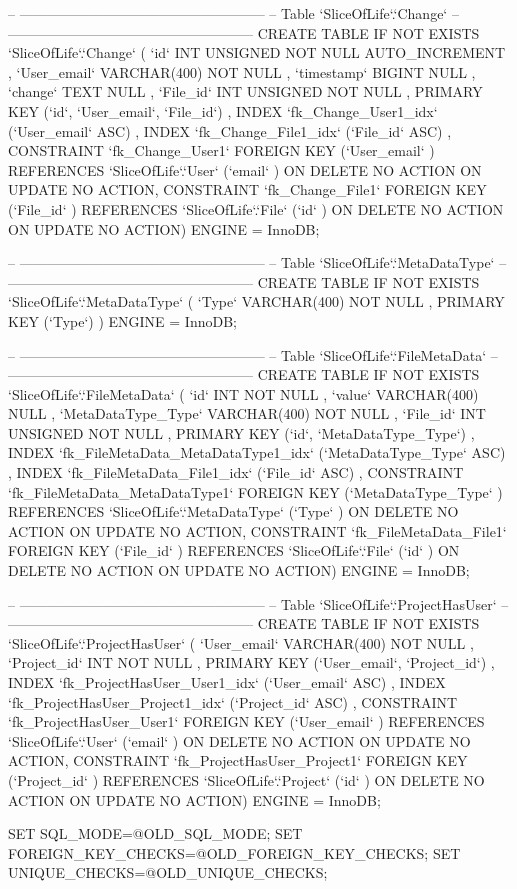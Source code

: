 \begin{spverbatim}
-- -----------------------------------------------------
-- Table `SliceOfLife`.`Change`
-- -----------------------------------------------------
CREATE  TABLE IF NOT EXISTS `SliceOfLife`.`Change` (
  `id` INT UNSIGNED NOT NULL AUTO_INCREMENT ,
  `User_email` VARCHAR(400) NOT NULL ,
  `timestamp` BIGINT NULL ,
  `change` TEXT NULL ,
  `File_id` INT UNSIGNED NOT NULL ,
  PRIMARY KEY (`id`, `User_email`, `File_id`) ,
  INDEX `fk_Change_User1_idx` (`User_email` ASC) ,
  INDEX `fk_Change_File1_idx` (`File_id` ASC) ,
  CONSTRAINT `fk_Change_User1`
    FOREIGN KEY (`User_email` )
    REFERENCES `SliceOfLife`.`User` (`email` )
    ON DELETE NO ACTION
    ON UPDATE NO ACTION,
  CONSTRAINT `fk_Change_File1`
    FOREIGN KEY (`File_id` )
    REFERENCES `SliceOfLife`.`File` (`id` )
    ON DELETE NO ACTION
    ON UPDATE NO ACTION)
ENGINE = InnoDB;


-- -----------------------------------------------------
-- Table `SliceOfLife`.`MetaDataType`
-- -----------------------------------------------------
CREATE  TABLE IF NOT EXISTS `SliceOfLife`.`MetaDataType` (
  `Type` VARCHAR(400) NOT NULL ,
  PRIMARY KEY (`Type`) )
ENGINE = InnoDB;


-- -----------------------------------------------------
-- Table `SliceOfLife`.`FileMetaData`
-- -----------------------------------------------------
CREATE  TABLE IF NOT EXISTS `SliceOfLife`.`FileMetaData` (
  `id` INT NOT NULL ,
  `value` VARCHAR(400) NULL ,
  `MetaDataType_Type` VARCHAR(400) NOT NULL ,
  `File_id` INT UNSIGNED NOT NULL ,
  PRIMARY KEY (`id`, `MetaDataType_Type`) ,
  INDEX `fk_FileMetaData_MetaDataType1_idx` (`MetaDataType_Type` ASC) ,
  INDEX `fk_FileMetaData_File1_idx` (`File_id` ASC) ,
  CONSTRAINT `fk_FileMetaData_MetaDataType1`
    FOREIGN KEY (`MetaDataType_Type` )
    REFERENCES `SliceOfLife`.`MetaDataType` (`Type` )
    ON DELETE NO ACTION
    ON UPDATE NO ACTION,
  CONSTRAINT `fk_FileMetaData_File1`
    FOREIGN KEY (`File_id` )
    REFERENCES `SliceOfLife`.`File` (`id` )
    ON DELETE NO ACTION
    ON UPDATE NO ACTION)
ENGINE = InnoDB;


-- -----------------------------------------------------
-- Table `SliceOfLife`.`ProjectHasUser`
-- -----------------------------------------------------
CREATE  TABLE IF NOT EXISTS `SliceOfLife`.`ProjectHasUser` (
  `User_email` VARCHAR(400) NOT NULL ,
  `Project_id` INT NOT NULL ,
  PRIMARY KEY (`User_email`, `Project_id`) ,
  INDEX `fk_ProjectHasUser_User1_idx` (`User_email` ASC) ,
  INDEX `fk_ProjectHasUser_Project1_idx` (`Project_id` ASC) ,
  CONSTRAINT `fk_ProjectHasUser_User1`
    FOREIGN KEY (`User_email` )
    REFERENCES `SliceOfLife`.`User` (`email` )
    ON DELETE NO ACTION
    ON UPDATE NO ACTION,
  CONSTRAINT `fk_ProjectHasUser_Project1`
    FOREIGN KEY (`Project_id` )
    REFERENCES `SliceOfLife`.`Project` (`id` )
    ON DELETE NO ACTION
    ON UPDATE NO ACTION)
ENGINE = InnoDB;



SET SQL_MODE=@OLD_SQL_MODE;
SET FOREIGN_KEY_CHECKS=@OLD_FOREIGN_KEY_CHECKS;
SET UNIQUE_CHECKS=@OLD_UNIQUE_CHECKS;
\end{spverbatim}
\newpage
